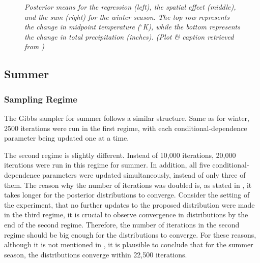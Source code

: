 \documentclass{article}
\begin{document}
\begin{figure}
  \centering
  \caption{\small \emph{Posterior means for the regression (left), the spatial effect (middle), and the sum (right) for the winter season. The top row represents the change in midpoint temperature ($^\circ$K), while the bottom represents the change in total precipitation (inches). (Plot \& caption retrieved from \cite{paper})}}
  \label{fig: Fig5}
\end{figure}

\subsection{Summer}
\subsubsection{Sampling Regime}
The Gibbs sampler for summer follows a similar structure. Same as for winter, 2500 iterations were run in the first regime, with each conditional-dependence parameter being updated one at a time. 

The second regime is slightly different. Instead of 10,000 iterations, 20,000 iterations were run in this regime for summer. In addition, all five conditional-dependence parameters were updated simultaneously, instead of only three of them. The reason why the number of iterations was doubled is, as stated in \cite{paper}, it takes longer for the posterior distributions to converge. Consider the setting of the experiment, that no further updates to the proposed distribution were made in the third regime, it is crucial to observe convergence in distributions by the end of the second regime. Therefore, the number of iterations in the second regime should be big enough for the distributions to converge. For these reasons, although it is not mentioned in \cite{paper}, it is plausible to conclude that for the summer season, the distributions converge within 22,500 iterations.
\end{document}

